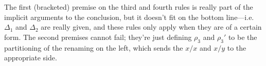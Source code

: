 \documentclass{amsart}
\let\types\vdash %
\let\mypm\pm
\def\pm{^\mypm}
\def\ps{+}
\def\ms{-}
\newcommand\uns{\times}
\def\flip#1{#1^*} %
\newcommand\combine{,}
\newcommand\triv{\_}
\begin{document}
The first (bracketed) premise on the third and fourth rules is really
part of the implicit arguments to the conclusion, but it doesn't fit on
the bottom line---i.e. $\Delta_1$ and $\Delta_2$ are really given, and
these rules only apply when they are of a certain form.  The second
premises cannot fail; they're just defining $\rho_3$ and $\rho_3'$ to be
the partitioning of the renaming on the left, which sends the $x/x$ and
$x/y$ to the appropriate side.  







\end{document}
